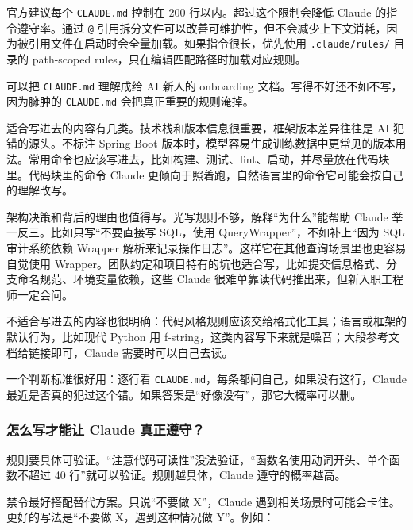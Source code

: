 \documentclass[9pt,a4paper,twocolumn]{ctexart}
\begin{document}
官方建议每个 \texttt{CLAUDE.md} 控制在 200 行以内。超过这个限制会降低 Claude 的指令遵守率。通过 \texttt{@} 引用拆分文件可以改善可维护性，但不会减少上下文消耗，因为被引用文件在启动时会全量加载。如果指令很长，优先使用 \texttt{.claude/rules/} 目录的 path-scoped rules，只在编辑匹配路径时加载对应规则。



可以把 \texttt{CLAUDE.md} 理解成给 AI 新人的 onboarding 文档。写得不好还不如不写，因为臃肿的 \texttt{CLAUDE.md} 会把真正重要的规则淹掉。



适合写进去的内容有几类。技术栈和版本信息很重要，框架版本差异往往是 AI 犯错的源头。不标注 Spring Boot 版本时，模型容易生成训练数据中更常见的版本用法。常用命令也应该写进去，比如构建、测试、lint、启动，并尽量放在代码块里。代码块里的命令 Claude 更倾向于照着跑，自然语言里的命令它可能会按自己的理解改写。



架构决策和背后的理由也值得写。光写规则不够，解释“为什么”能帮助 Claude 举一反三。比如只写“不要直接写 SQL，使用 QueryWrapper”，不如补上“因为 SQL 审计系统依赖 Wrapper 解析来记录操作日志”。这样它在其他查询场景里也更容易自觉使用 Wrapper。团队约定和项目特有的坑也适合写，比如提交信息格式、分支命名规范、环境变量依赖，这些 Claude 很难单靠读代码推出来，但新入职工程师一定会问。



不适合写进去的内容也很明确：代码风格规则应该交给格式化工具；语言或框架的默认行为，比如现代 Python 用 f-string，这类内容写下来就是噪音；大段参考文档给链接即可，Claude 需要时可以自己去读。



一个判断标准很好用：逐行看 \texttt{CLAUDE.md}，每条都问自己，如果没有这行，Claude 最近是否真的犯过这个错。如果答案是“好像没有”，那它大概率可以删。



\subsubsection{怎么写才能让 Claude 真正遵守？}


规则要具体可验证。“注意代码可读性”没法验证，“函数名使用动词开头、单个函数不超过 40 行”就可以验证。规则越具体，Claude 遵守的概率越高。



禁令最好搭配替代方案。只说“不要做 X”，Claude 遇到相关场景时可能会卡住。更好的写法是“不要做 X，遇到这种情况做 Y”。例如：
\end{document}
